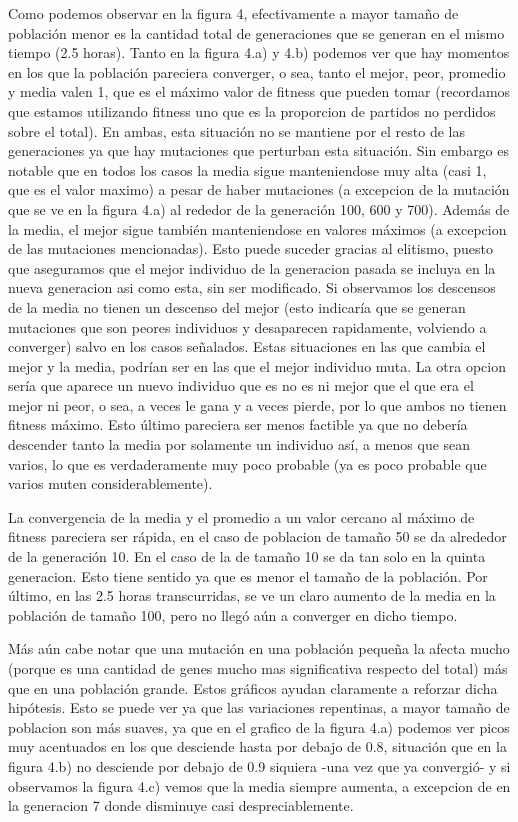 \documentclass[A4paper,oneside,fleqn,11pt]{article}
\theoremstyle{definition}
\begin{document}
Como podemos observar en la figura 4, efectivamente a mayor tamaño de población menor es la cantidad total de generaciones que se generan en el mismo tiempo (2.5 horas). Tanto en la figura 4.a) y 4.b) podemos ver que hay momentos en los que la población pareciera converger, o sea, tanto el mejor, peor, promedio y media valen 1, que es el máximo valor de fitness que pueden tomar (recordamos que estamos utilizando fitness uno que es la proporcion de partidos no perdidos sobre el total). En ambas, esta situación no se mantiene por el resto de las generaciones ya que hay mutaciones que perturban esta situación. Sin embargo es notable que en todos los casos la media sigue manteniendose muy alta (casi 1, que es el valor maximo) a pesar de haber mutaciones (a excepcion de la mutación que se ve en la figura 4.a) al rededor de la generación  100, 600 y 700). Además de la media, el mejor sigue también manteniendose en valores máximos (a excepcion de las mutaciones mencionadas). Esto puede suceder gracias al elitismo, puesto que aseguramos que el mejor individuo de la generacion pasada se incluya en la nueva generacion asi como esta, sin ser modificado. Si observamos los descensos de la media no tienen un descenso del mejor (esto indicaría que se generan mutaciones que son peores individuos y desaparecen rapidamente, volviendo a converger) salvo en los casos señalados. Estas situaciones en las que cambia el mejor y la media, podrían ser en las que el mejor individuo muta. La otra opcion sería que aparece un nuevo individuo que es no es ni mejor que el que era el mejor ni peor, o sea, a veces le gana y a veces pierde, por lo que ambos no tienen fitness máximo. Esto último pareciera ser menos factible ya que no debería descender tanto la media por solamente un individuo así, a menos que sean varios, lo que es verdaderamente muy poco probable (ya es poco probable que varios muten considerablemente).

La convergencia de la media y el promedio a un valor cercano al máximo de fitness pareciera ser rápida, en el caso de poblacion de tamaño 50 se da alrededor de la generación 10. En el caso de la de tamaño 10 se da tan solo en la quinta generacion. Esto tiene sentido ya que es menor el tamaño de la población. Por último, en las 2.5 horas transcurridas, se ve un claro aumento de la media en la población de tamaño 100, pero no llegó aún a converger en dicho tiempo.

Más aún cabe notar que una mutación en una población pequeña la afecta mucho (porque es una cantidad de genes mucho mas significativa respecto del total) más que en una población grande. Estos gráficos ayudan claramente a reforzar dicha hipótesis. Esto se puede ver ya que las variaciones repentinas, a mayor tamaño de poblacion son más suaves, ya que en el grafico de la figura 4.a) podemos ver picos muy acentuados en los que desciende hasta por debajo de 0.8, situación que en la figura 4.b) no desciende por debajo de 0.9 siquiera -una vez que ya convergió- y si observamos la figura 4.c) vemos que la media siempre aumenta, a excepcion de en la generacion 7 donde disminuye casi despreciablemente. 
\end{document}
